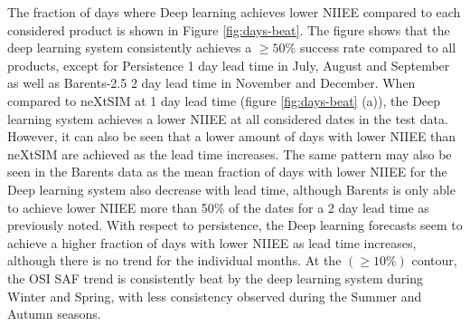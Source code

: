 \documentclass[../main/thesis.tex]{subfiles}
\begin{document}
The fraction of days where Deep learning achieves lower NIIEE compared to each considered product is shown in Figure \ref{fig:days-beat}. The figure shows that the deep learning system consistently achieves a $\geq50\%$ success rate compared to all products, except for Persistence 1 day lead time in July, August and September as well as Barents-2.5 2 day lead time in November and December. When compared to neXtSIM at 1 day lead time (figure \ref{fig:days-beat} (a)), the Deep learning system achieves a lower NIIEE at all considered dates in the test data. However, it can also be seen that a lower amount of days with lower NIIEE than neXtSIM are achieved as the lead time increases. The same pattern may also be seen in the Barents data as the mean fraction of days with lower NIIEE for the Deep learning system also decrease with lead time, although Barents is only able to achieve lower NIIEE more than 50\% of the dates for a 2 day lead time as previously noted. With respect to persistence, the Deep learning forecasts seem to achieve a higher fraction of days with lower NIIEE as lead time increases, although there is no trend for the individual months. At the $(\geq10\%)$ contour, the OSI SAF trend is consistently beat by the deep learning system during Winter and Spring, with less consistency observed during the Summer and Autumn seasons.
\end{document}
